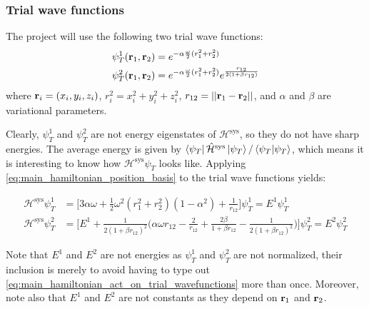 \documentclass[nofootinbib,reprint,english]{revtex4-1}
\newcommand{\hatHH}{\hat{\mathcal{H}}}
\newcommand{\HH}{\mathcal{H}}
\begin{document}
\subsubsection{Trial wave functions}
The project will use the following two trial wave functions:
\begin{subequations}\label{eq:trial_wavefunctions}
\begin{align}
\psi_T^1(\vb{r}_1,\vb{r}_2)&=e^{-\alpha\frac{\omega}{2}(r_1^2+r_2^2)}\\
\psi_T^2(\vb{r}_1,\vb{r}_2)&=e^{-\alpha\frac{\omega}{2}(r_1^2+r_2^2)}e^{\frac{r_{12}}{2(1+\beta r_{12})}}
\end{align}
\end{subequations}
where \(\vb{r}_i=(x_i,y_i,z_i)\), \(r_i^2=x_i^2+y_i^2+z_i^2\), \(r_{12}=||\vb{r}_1-\vb{r}_2||\), and \(\alpha\) and \(\beta\) are variational parameters.

Clearly, \(\psi_T^1\) and \(\psi_T^2\) are not energy eigenstates of \(\HH^\text{sys}\), so they do not have sharp energies. The average energy is given by \(\bra{\psi_T}\hatHH^\text{sys}\ket{\psi_T}/\braket{\psi_T}\), which means it is interesting to know how \(\HH^\text{sys}\psi_T\) looks like. Applying \eqref{eq:main_hamiltonian_position_basis} to the trial wave functions yields:
\begin{widetext}
\begin{subequations}\label{eq:main_hamiltonian_act_on_trial_wavefunctions}
\begin{align}
\HH^\text{sys}\psi_T^1&=\bigg[3\alpha\omega+\frac{1}{2}\omega^2(r_1^2+r_2^2)(1-\alpha^2)+\frac{1}{r_{12}}\bigg]\psi_T^1=E^1\psi_T^1\\
\HH^\text{sys}\psi_T^2&=\bigg[E^1+\frac{1}{2(1+\beta r_{12})^2}\Big(\alpha\omega r_{12}-\frac{2}{r_{12}}+\frac{2\beta}{1+\beta r_{12}}-\frac{1}{2(1+\beta r_{12})^2}\Big)\bigg]\psi_T^2=E^2\psi_T^2
\end{align}
\end{subequations}
\end{widetext}
Note that \(E^1\) and \(E^2\) are not energies as \(\psi_T^1\) and \(\psi_T^2\) are not normalized, their inclusion is merely to avoid having to type out \eqref{eq:main_hamiltonian_act_on_trial_wavefunctions} more than once. Moreover, note also that \(E^1\) and \(E^2\) are not constants as they depend on \(\vb{r}_1\) and \(\vb{r}_2\).
\end{document}

